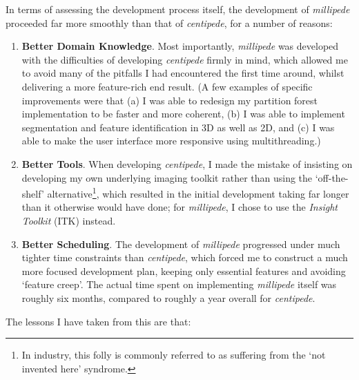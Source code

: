 In terms of assessing the development process itself, the development of \emph{millipede} proceeded far more smoothly than that of \emph{centipede}, for a number of reasons:
%
\begin{enumerate}

\item \textbf{Better Domain Knowledge}. Most importantly, \emph{millipede} was developed with the difficulties of developing \emph{centipede} firmly in mind, which allowed me to avoid many of the pitfalls I had encountered the first time around, whilst delivering a more feature-rich end result. (A few examples of specific improvements were that (a) I was able to redesign my partition forest implementation to be faster and more coherent, (b) I was able to implement segmentation and feature identification in 3D as well as 2D, and (c) I was able to make the user interface more responsive using multithreading.)

\item \textbf{Better Tools}. When developing \emph{centipede}, I made the mistake of insisting on developing my own underlying imaging toolkit rather than using the `off-the-shelf' alternative\footnote{In industry, this folly is commonly referred to as suffering from the `not invented here' syndrome.}, which resulted in the initial development taking far longer than it otherwise would have done; for \emph{millipede}, I chose to use the \emph{Insight Toolkit} (ITK) instead.

\item \textbf{Better Scheduling}. The development of \emph{millipede} progressed under much tighter time constraints than \emph{centipede}, which forced me to construct a much more focused development plan, keeping only essential features and avoiding `feature creep'. The actual time spent on implementing \emph{millipede} itself was roughly six months, compared to roughly a year overall for \emph{centipede}.

\end{enumerate}
%
The lessons I have taken from this are that:
%
